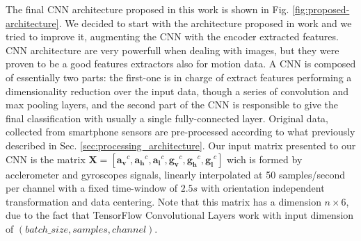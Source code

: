 The final CNN architecture proposed in this work is shown in Fig. \ref{fig:proposed-architecture}. We decided to start with the architecture proposed in work \cite{chen2020deep} and we tried to improve it, augmenting the CNN with the encoder extracted features. CNN architecture are very powerfull when dealing with images, but they were proven to be a good features extractors also for motion data. A CNN is composed of essentially two parts: the first-one is in charge of extract features performing a dimensionality reduction over the input data, though a series of convolution and max pooling layers, and the second part of the CNN is responsible to give the final classification with usually a single fully-connected layer. Original data, collected from smartphone sensors are pre-processed according to what previously described in Sec. \ref{sec:processing_architecture}. Our input matrix presented to our CNN is the matrix \mbox{$ \boldsymbol{X} = [ \boldsymbol{a_{v}}^{c}, \boldsymbol{a_{h}}^{c}, \boldsymbol{a_{l}}^{c}, \boldsymbol{g_{v}}^{c}, \boldsymbol{g_{h}}^{c}, \boldsymbol{g_{l}}^{c}]$} wich is formed by acclerometer and gyroscopes signals, linearly interpolated at 50 samples/second  per channel with a fixed time-window of $2.5s$ with orientation independent transformation and data centering. Note that this matrix has a dimension $n \times 6$, due to the fact that TensorFlow Convolutional Layers work with input dimension of $(batch\_size, samples, channel)$.

